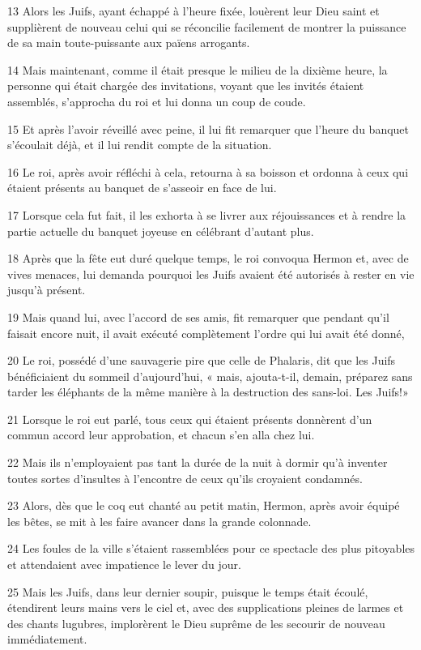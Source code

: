 \par 13 Alors les Juifs, ayant échappé à l'heure fixée, louèrent leur Dieu saint et supplièrent de nouveau celui qui se réconcilie facilement de montrer la puissance de sa main toute-puissante aux païens arrogants.
\par 14 Mais maintenant, comme il était presque le milieu de la dixième heure, la personne qui était chargée des invitations, voyant que les invités étaient assemblés, s'approcha du roi et lui donna un coup de coude.
\par 15 Et après l'avoir réveillé avec peine, il lui fit remarquer que l'heure du banquet s'écoulait déjà, et il lui rendit compte de la situation.
\par 16 Le roi, après avoir réfléchi à cela, retourna à sa boisson et ordonna à ceux qui étaient présents au banquet de s'asseoir en face de lui.
\par 17 Lorsque cela fut fait, il les exhorta à se livrer aux réjouissances et à rendre la partie actuelle du banquet joyeuse en célébrant d'autant plus.
\par 18 Après que la fête eut duré quelque temps, le roi convoqua Hermon et, avec de vives menaces, lui demanda pourquoi les Juifs avaient été autorisés à rester en vie jusqu'à présent.
\par 19 Mais quand lui, avec l'accord de ses amis, fit remarquer que pendant qu'il faisait encore nuit, il avait exécuté complètement l'ordre qui lui avait été donné,
\par 20 Le roi, possédé d'une sauvagerie pire que celle de Phalaris, dit que les Juifs bénéficiaient du sommeil d'aujourd'hui, « mais, ajouta-t-il, demain, préparez sans tarder les éléphants de la même manière à la destruction des sans-loi. Les Juifs!»
\par 21 Lorsque le roi eut parlé, tous ceux qui étaient présents donnèrent d'un commun accord leur approbation, et chacun s'en alla chez lui.
\par 22 Mais ils n'employaient pas tant la durée de la nuit à dormir qu'à inventer toutes sortes d'insultes à l'encontre de ceux qu'ils croyaient condamnés.
\par 23 Alors, dès que le coq eut chanté au petit matin, Hermon, après avoir équipé les bêtes, se mit à les faire avancer dans la grande colonnade.
\par 24 Les foules de la ville s'étaient rassemblées pour ce spectacle des plus pitoyables et attendaient avec impatience le lever du jour.
\par 25 Mais les Juifs, dans leur dernier soupir, puisque le temps était écoulé, étendirent leurs mains vers le ciel et, avec des supplications pleines de larmes et des chants lugubres, implorèrent le Dieu suprême de les secourir de nouveau immédiatement.
